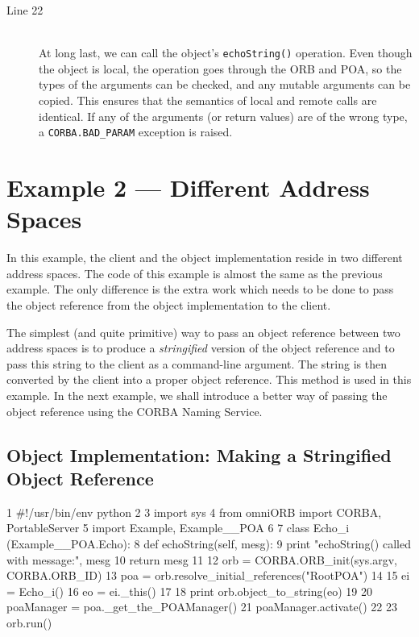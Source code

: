 \documentclass[11pt,twoside,a4paper]{book}
\newcommand{\code}[1]{\texttt{#1}}
\newcommand{\op}[1]{\texttt{#1()}}
\newcommand{\term}[1]{\textit{#1}}
\begin{document}
\begin{description}

\item[Line 22]\mbox{}\\
%
At long last, we can call the object's \op{echoString} operation.
Even though the object is local, the operation goes through the ORB
and POA, so the types of the arguments can be checked, and any mutable
arguments can be copied. This ensures that the semantics of local and
remote calls are identical. If any of the arguments (or return values)
are of the wrong type, a \code{CORBA.BAD\_PARAM} exception is raised.

\end{description}


\section{Example 2 --- Different Address Spaces}

In this example, the client and the object implementation reside in
two different address spaces. The code of this example is almost the
same as the previous example. The only difference is the extra work
which needs to be done to pass the object reference from the object
implementation to the client.

The simplest (and quite primitive) way to pass an object reference
between two address spaces is to produce a \term{stringified} version
of the object reference and to pass this string to the client as a
command-line argument.  The string is then converted by the client
into a proper object reference.  This method is used in this
example. In the next example, we shall introduce a better way of
passing the object reference using the CORBA Naming Service.


\subsection{Object Implementation: Making a Stringified Object Reference}

\lstset{stepnumber=1,gobble=4}
\begin{pylisting}
 1  #!/usr/bin/env python
 2  
 3  import sys
 4  from omniORB import CORBA, PortableServer
 5  import Example, Example__POA
 6  
 7  class Echo_i (Example__POA.Echo):
 8      def echoString(self, mesg):
 9          print "echoString() called with message:", mesg
10          return mesg
11  
12  orb = CORBA.ORB_init(sys.argv, CORBA.ORB_ID)
13  poa = orb.resolve_initial_references("RootPOA")
14  
15  ei = Echo_i()
16  eo = ei._this()
17  
18  print orb.object_to_string(eo)
19  
20  poaManager = poa._get_the_POAManager()
21  poaManager.activate()
22  
23  orb.run()
\end{pylisting}
\lstset{stepnumber=0,gobble=0}
\end{document}
